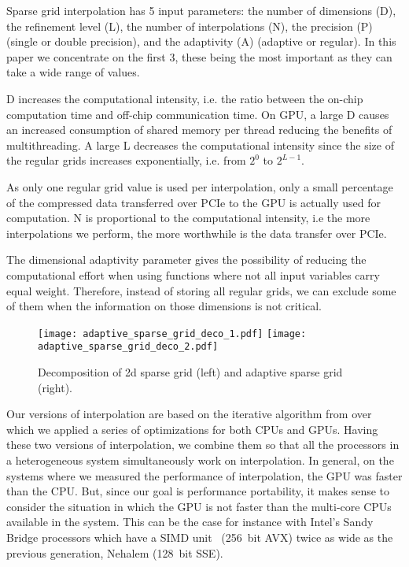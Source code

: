 Sparse grid interpolation has 5 input parameters: the number of dimensions (D),
the refinement level (L), the number of interpolations (N), the precision (P)
(single or double precision), and the adaptivity (A) (adaptive or regular). In
this paper we concentrate on the first 3, these being the most important as they
can take a wide range of values.

D increases the computational intensity, i.e. the ratio between the on-chip
computation time and off-chip communication time. On GPU, a large D causes an
increased consumption of shared memory per thread reducing the benefits of
multithreading. A large L decreases the computational intensity since the size
of the regular grids increases exponentially, i.e. from $2^0$ to $2^{L-1}$. 

As only one regular grid value is used per interpolation, only a small
percentage of the compressed data transferred over PCIe to the GPU is actually
used for computation. N is proportional to the computational intensity, i.e the
more interpolations we perform, the more worthwhile is the data transfer over
PCIe.

The dimensional adaptivity parameter gives the possibility of reducing the
computational effort when using functions where not all input variables carry
equal weight. Therefore, instead of storing all regular grids, we can exclude
some of them when the information on those dimensions is not critical.

\begin{figure}[H]
  \centering
  \texttt{[image: adaptive\_sparse\_grid\_deco\_1.pdf]}
  \hspace{0cm}
  \texttt{[image: adaptive\_sparse\_grid\_deco\_2.pdf]}
  \caption{Decomposition of 2d sparse grid (left) and adaptive sparse grid
  (right).}
  \label{fig:adaptive_sparse_grid_deco}
\end{figure}

Our versions of interpolation are based on the iterative algorithm from
\cite{murarasu2011} over which we applied a series of optimizations for both
CPUs and GPUs. Having these two versions of interpolation, we combine them so
that all the processors in a heterogeneous system simultaneously work on
interpolation. In general, on the systems where we measured the performance of
interpolation, the GPU was faster than the CPU. But, since our goal is
performance portability, it makes sense to consider the situation in which the
GPU is not faster than the multi-core CPUs available in the system. This can be
the case for instance with Intel's Sandy Bridge processors which have a SIMD
unit~\cite{avx} (256~bit AVX) twice as wide as the previous generation, Nehalem
(128~bit SSE).


